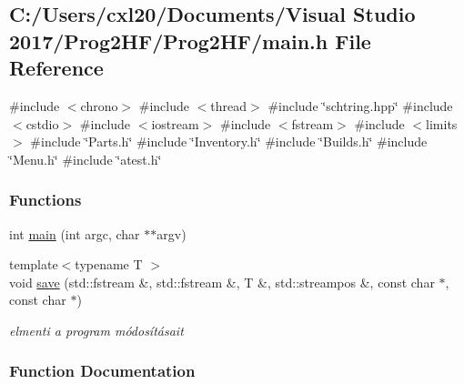 \subsection{C\+:/\+Users/cxl20/\+Documents/\+Visual Studio 2017/\+Prog2\+H\+F/\+Prog2\+H\+F/main.h File Reference}
\label{main_8h}
{\ttfamily \#include $<$chrono$>$}\newline
{\ttfamily \#include $<$thread$>$}\newline
{\ttfamily \#include \char`\"{}schtring.\+hpp\char`\"{}}\newline
{\ttfamily \#include $<$cstdio$>$}\newline
{\ttfamily \#include $<$iostream$>$}\newline
{\ttfamily \#include $<$fstream$>$}\newline
{\ttfamily \#include $<$limits$>$}\newline
{\ttfamily \#include \char`\"{}Parts.\+h\char`\"{}}\newline
{\ttfamily \#include \char`\"{}Inventory.\+h\char`\"{}}\newline
{\ttfamily \#include \char`\"{}Builds.\+h\char`\"{}}\newline
{\ttfamily \#include \char`\"{}Menu.\+h\char`\"{}}\newline
{\ttfamily \#include \char`\"{}atest.\+h\char`\"{}}\newline
\subsubsection*{Functions}
\begin{DoxyCompactItemize}
\item 
int \mbox{\hyperlink{main_8h_a3c04138a5bfe5d72780bb7e82a18e627}{main}} (int argc, char $\ast$$\ast$argv)
\item 
{\footnotesize template$<$typename T $>$ }\\void \mbox{\hyperlink{main_8h_a0060785675592b854caa528edb88d690}{save}} (std\+::fstream \&, std\+::fstream \&, T \&, std\+::streampos \&, const char $\ast$, const char $\ast$)
\begin{DoxyCompactList}\small\item\em elmenti a program módosításait \end{DoxyCompactList}\end{DoxyCompactItemize}


\subsubsection{Function Documentation}
\mbox{\label{main_8h_a3c04138a5bfe5d72780bb7e82a18e627}} 
